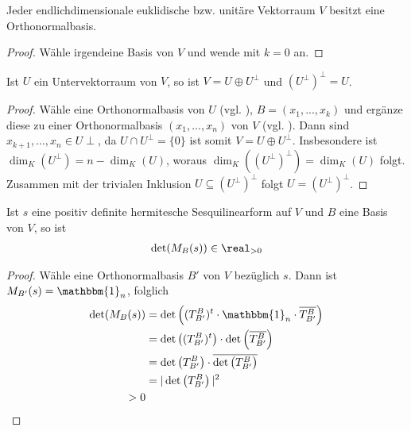 \begin{conclusion}
	Jeder endlichdimensionale euklidische bzw. unitäre Vektorraum $V$ besitzt eine Orthonormalbasis.
\end{conclusion}
\begin{proof}
	Wähle irgendeine Basis von $V$ und wende  mit $k=0$ an.
\end{proof}

\begin{conclusion}
	Ist $U$ ein Untervektorraum von $V$, so ist $V=U\oplus U^\perp$ und $(U^\perp)^\perp=U$.
\end{conclusion}
\begin{proof}
	Wähle eine Orthonormalbasis von $U$ (vgl. ), $B=(x_1,...,x_k)$ und ergänze diese zu einer Orthonormalbasis $(x_1,...,x_n)$ von $V$ (vgl. ). Dann sind $x_{k+1},...,x_n\in U\perp$, da $U\cap U^\perp=\{0\}$ ist somit $V=U\oplus U^\perp$. Insbesondere ist $\dim_K(U^\perp)=n-\dim_K(U)$, woraus $\dim_K((U^\perp)^\perp)=\dim_K(U)$ folgt. Zusammen mit der trivialen Inklusion $U\subseteq (U^\perp)^\perp$ folgt $U=(U^\perp)^\perp$.
\end{proof}

\begin{conclusion}
	Ist $s$ eine positiv definite hermitesche Sesquilinearform auf $V$ und $B$ eine Basis von $V$, so ist 
	\begin{align}
		\det(M_B(s))\in \real_{>0}\notag
	\end{align}
\end{conclusion}
\begin{proof}
	Wähle eine Orthonormalbasis $B'$ von $V$ bezüglich $s$. Dann ist $M_{B'}(s)=\mathbbm{1}_n$, folglich 
	\begin{align}
		\det(M_B(s))&=\det\left( (T_{B'}^B)^t\cdot \mathbbm{1}_n\cdot\overline{T_{B'}^B} \right)\notag \\
		&= \det\left( (T_{B'}^B)^t \right) \cdot \det\left( \overline{T_{B'}^B} \right) \notag\\
		&= \det\left( T_{B'}^B \right) \cdot\overline{\det\left( T_{B'}^B\right)}\notag \\
		&= \vert \det\left( T_{B'}^B \right) \vert^2\notag \\
		>0\notag
	\end{align}
\end{proof}
